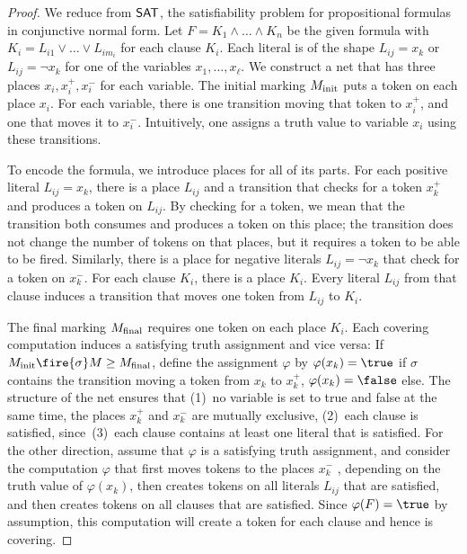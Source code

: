 \documentclass[../../diss.tex]{subfiles}
\begin{document}
\begin{proof}
    We reduce from $\mathsf{SAT}$, the satisfiability problem for propositional formulas in conjunctive normal form.
    Let $F = K_1 \wedge \ldots \wedge K_n$ be the given formula with $K_i = L_{i1} \vee \ldots \vee L_{im_i}$ for each clause $K_i$.
    Each literal is of the shape $L_{ij} = x_k$ or $L_{ij} = \neg x_k$ for one of the variables $x_1, \ldots, x_\ell$.
    We construct a net that has three places $x_i, x_i^+, x_i^-$ for each variable.
    The initial marking $M_{\text{init}}$ puts a token on each place $x_i$.
    For each variable, there is one transition moving that token to $x_i^+$, and one that moves it to $x_i^-$.
    Intuitively, one assigns a truth value to variable $x_i$ using these transitions.

    To encode the formula, we introduce places for all of its parts.
    For each positive literal $L_{ij} = x_k$, there is a place $L_{ij}$ and a transition that checks for a token $x_k^+$ and produces a token on $L_{ij}$.
    By checking for a token, we mean that the transition both consumes and produces a token on this place; the transition does not change the number of tokens on that places, but it requires a token to be able to be fired.
    Similarly, there is a place for negative literals $L_{ij} = \neg x_k$ that check for a token on $x_k^-$.
    For each clause $K_i$, there is a place $K_i$.
    Every literal $L_{ij}$ from that clause induces a transition that moves one token from $L_{ij}$ to $K_i$.

    The final marking $M_{\text{final}}$ requires one token on each place $K_i$.
    Each covering computation induces a satisfying truth assignment and vice versa:
    If $\Minit \fire{\sigma} M \geq \Mfinal$, define the assignment $\varphi$ by $\varphi(x_k) = \true$ if $\sigma$ contains the transition moving a token from $x_k$ to $x_k^+$, $\varphi(x_k) = \false$ else.
    The structure of the net ensures that (1)~no variable is set to true and false at the same time, \ie the places $x_k^+$ and $x_k^-$ are mutually exclusive, (2)~each clause is satisfied, since~(3)~each clause contains at least one literal that is satisfied.
    For the other direction, assume that $\varphi$ is a satisfying truth assignment, and consider the computation $\varphi$ that first moves tokens to the places $x_k^-$ , depending on the truth value of $\varphi(x_k)$, then creates tokens on all literals $L_{ij}$ that are satisfied, and then creates tokens on all clauses that are satisfied.
    Since $\varphi(F) = \true$ by assumption, this computation will create a token for each clause and hence is covering.
\end{proof}
\end{document}

